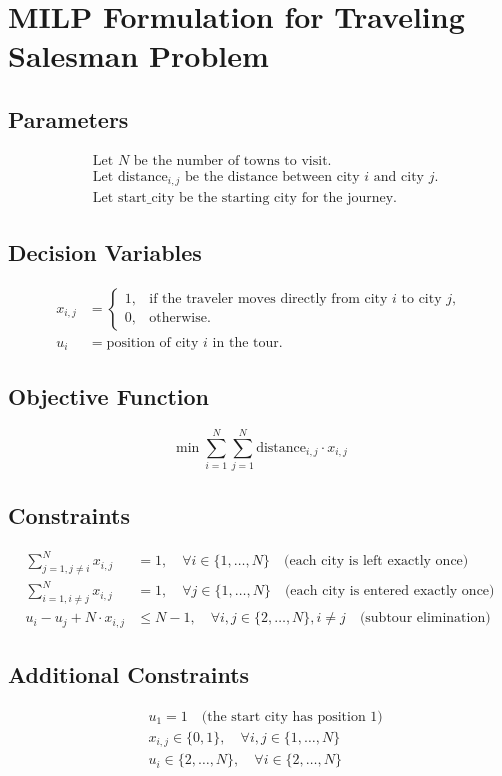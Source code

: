\documentclass{article}
\begin{document}
\section*{MILP Formulation for Traveling Salesman Problem}

\subsection*{Parameters}
\begin{align*}
    & \text{Let } N \text{ be the number of towns to visit.} \\
    & \text{Let } \text{distance}_{i,j} \text{ be the distance between city } i \text{ and city } j. \\
    & \text{Let } \text{start\_city} \text{ be the starting city for the journey.}
\end{align*}

\subsection*{Decision Variables}
\begin{align*}
    x_{i,j} &= 
    \begin{cases} 
    1, & \text{if the traveler moves directly from city } i \text{ to city } j, \\
    0, & \text{otherwise.}
    \end{cases} \\
    u_i &= \text{position of city } i \text{ in the tour.}
\end{align*}

\subsection*{Objective Function}
\[
\min \sum_{i=1}^{N} \sum_{j=1}^{N} \text{distance}_{i,j} \cdot x_{i,j}
\]

\subsection*{Constraints}
\begin{align}
    \sum_{j=1, j \neq i}^{N} x_{i,j} &= 1, \quad \forall i \in \{1, \ldots, N\} \quad \text{(each city is left exactly once)} \\
    \sum_{i=1, i \neq j}^{N} x_{i,j} &= 1, \quad \forall j \in \{1, \ldots, N\} \quad \text{(each city is entered exactly once)} \\
    u_i - u_j + N \cdot x_{i,j} &\leq N-1, \quad \forall i,j \in \{2, \ldots, N\}, i \neq j \quad \text{(subtour elimination)}
\end{align}

\subsection*{Additional Constraints}
\begin{align*}
    &u_1 = 1 \quad \text{(the start city has position 1)} \\
    &x_{i,j} \in \{0,1\}, \quad \forall i, j \in \{1, \ldots, N\} \\
    &u_i \in \{2, \ldots, N\}, \quad \forall i \in \{2, \ldots, N\}
\end{align*}
\end{document}
